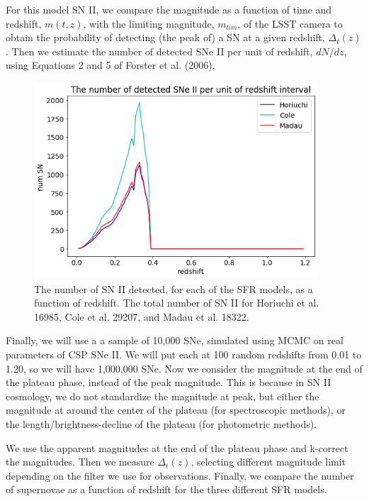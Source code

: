 \documentclass[12pt, onecolumn]{emulateapj}
\begin{document}
For this model SN II, we compare the magnitude as a function of time and redshift, $m(t,z)$, with the limiting magnitude, $m_{lim}$, of the LSST camera to obtain the probability of detecting (the peak of) a SN at a given redshift, $\Delta_{t}(z)$. Then we estimate the number of detected SNe II per unit of redshift, $dN/dz$, using Equations 2 and 5 of Forster et al. (2006).

\begin{figure}
	\begin{center}
		\includegraphics[width=0.95\textwidth]{number_SNII.png}
		\caption{The number of SN II detected, for each of the SFR models, as a function of redshift. The total number of SN II for Horiuchi et al. 16985, Cole et al. 29207, and Madau et al.  18322. }
		\label{fig:SNII_lc_wz}
	\end{center}
\end{figure}

Finally, we will use a a sample of 10,000 SNe, simulated using MCMC on real parameters of CSP SNe II. We will put each at 100 random redshifts from 0.01 to 1.20, so we will have 1,000,000 SNe. Now we consider the magnitude at the end of the plateau phase, instead of the peak magnitude. This is because in SN II cosmology, we do not standardize the magnitude at peak, but either the magnitude at around the center of the plateau (for spectroscopic methods), or the length/brightness-decline of the plateau (for photometric methods).

We use the apparent magnitudes at the end of the plateau phase and k-correct the magnitudes. Then we measure $\Delta_t(z)$, selecting different magnitude limit depending on the filter we use for observations. Finally, we compare the number of supernovae as a function of redshift for the three different SFR models.
\end{document}

